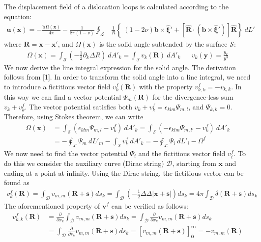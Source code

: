 The displacement field of a dislocation loops is calculated according to the equation\+: \[ \begin{align} \mathbf{u}(\mathbf x)=-\frac{\mathbf{ b}\Omega(\mathbf x)}{4\pi}-\frac{1}{8\pi(1-\nu)}\oint_\mathcal{L}&\frac{1}{R}\left\{\ \left(1-2\nu\right) \mathbf{ b}\times\hat{\mathbf{ \xi}}' + \left[\hat{\mathbf{ R}}\cdot\left(\mathbf{ b}\times\hat{\mathbf{ \xi}}' \right) \right]\hat{\mathbf{ R}} \right\}\ dL' \end{align} \] where $\mathbf{R}=\mathbf x-\mathbf x'$, and $\Omega(\mathbf x)$ is the solid angle subtended by the surface $\mathcal{S}$\+: \[ \begin{align} \Omega(\mathbf{x})=\int_\mathcal{S}\left(-\frac{1}{2}\partial_k\Delta R\right)\ dA'_k=\int_\mathcal{S} v_k(\mathbf R)\ dA'_k&&v_k(\mathbf y)=\frac{y_k}{y^3} \end{align} \] We now derive the line integral expression for the solid angle. The derivation follows from \mbox{[}1\mbox{]}. In order to transform the solid angle into a line integral, we need to introduce a fictitious vector field $v_k^f(\mathbf R)$ with the property $v^f_{k,k}=-v_{k,k}$. In this way we can find a vector potential $\Psi_m(\mathbf{R})$ for the divergence-\/less sum $v_k+v^f_k$. The vector potential satisfies both $v_k+v^f_k=\epsilon_{klm}\Psi_{m,l}$, and $\Psi_{k,k}=0$. Therefore, using Stokes theorem, we can write \[ \begin{align} \Omega(\mathbf{x})&=\int_\mathcal{S} \left(\epsilon_{klm}\Psi_{m,l}-v^f_k\right)\ dA'_k=\int_\mathcal{S} \left(-\epsilon_{klm}\Psi_{m,l'}-v^f_k\right)\ dA'_k\nonumber\\ &=-\oint_\mathcal{L}\Psi_m\ dL'_m-\int_\mathcal{S} v^f_k\ dA'_k=-\oint_\mathcal{L}\Psi_i\ dL'_i-\Omega^f \end{align} \] We now need to find the vector potential $\Psi_i$ and the fictitious vector field $v_i^f$. To do this we consider the auxiliary curve (Dirac string) $\mathcal{D}$, starting from $\mathbf x$ and ending at a point at infinity. Using the Dirac string, the fictitious vector can be found as \[ \begin{align} v^f_{k}(\mathbf{R})=\int_\mathcal{D}v_{m,m}(\mathbf{R}+\mathbf{s})ds_k =\int_\mathcal{D}\left(-\frac{1}{2}\Delta\Delta |\mathbf{x}+\mathbf{s}|\right)ds_k =4\pi\int_\mathcal{D}\delta(\mathbf{R}+\mathbf{s})ds_k \end{align} \] The aforementioned property of $\mathbf v^f$ can be verified as follows\+: \[ \begin{align} v^f_{k,k}(\mathbf{R}) &=\frac{\partial}{\partial x_k}\int_\mathcal{D}v_{m,m}(\mathbf{R}+\mathbf{s})ds_k =\int_\mathcal{D}\frac{\partial}{\partial x_k}v_{m,m}(\mathbf{R}+\mathbf{s})ds_k\nonumber\\ &=\int_\mathcal{D}\frac{\partial}{\partial s_k}v_{m,m}(\mathbf{R}+\mathbf{s})ds_k =\left[v_{m,m}(\mathbf{R}+\mathbf{s})\right]_\mathbf{0}^\infty=-v_{m,m}(\mathbf{R}) \end{align} \]

